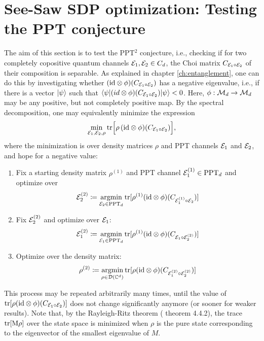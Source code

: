 \section{See-Saw SDP optimization: Testing the PPT conjecture}\label{ch:result-numerics}
The aim of this section is to test the PPT$^2$ conjecture, i.e., checking if for two completely copositive quantum channels $\mathcal E_1, \mathcal E_2 \in C_d$, the Choi matrix $C_{\mathcal E_1\circ \mathcal E_2}$ of their composition is separable. As explained in chapter \ref{ch:entanglement}, one can do this by investigating whether $(\mathrm{id} \otimes \phi)(C_{\mathcal E_1\circ \mathcal E_2})$ has a negative eigenvalue, i.e., if there is a vector $\lvert\psi\rangle$ such that $\langle\psi\rvert (id \otimes \phi)(C_{\mathcal E_1\circ \mathcal E_2}) \lvert\psi\rangle < 0$. Here, $\phi:\mathcal M_d \rightarrow \mathcal M_d$ may be any positive, but not completely positive map. By the spectral decomposition, one may equivalently minimize the expression
\begin{align}
    \min_{\mathcal{E}_1, \mathcal{E}_2, \rho} \mathrm{tr} \Big[ \rho \, (\text{id} \otimes \phi)(C_{\mathcal{E}_1 \circ \mathcal{E}_2}) \Big],
\end{align}
where the minimization is over density matrices $\rho$ and PPT channels $\mathcal E_1$ and $\mathcal E_2$, and hope for a negative value:
\begin{enumerate}
    \item Fix a starting density matrix $\rho^{(1)}$ and PPT channel $\mathcal E_1^{(1)}\in \text{PPT}_d$ and optimize over
    \begin{align*}
        \mathcal E_2^{(2)}\coloneqq \operatorname*{argmin}_{\mathcal E_2\in\text{PPT}_d}\mathrm{tr}[\rho^{(1)} (\mathrm{id} \otimes \phi)(C_{\mathcal E_1^{(1)}\circ \mathcal E_2})]
    \end{align*}
    \item Fix $\mathcal E_2^{(2)}$ and optimize over $\mathcal E_1$:
    \begin{align*}
        \mathcal E_1^{(2)}\coloneqq \operatorname*{argmin}_{\mathcal E_1\in\text{PPT}_d}\mathrm{tr}[\rho^{(1)} (\mathrm{id} \otimes \phi)(C_{\mathcal E_1\circ \mathcal E_2^{(2)}})]
    \end{align*}
    \item Optimize over the density matrix: 
    \begin{align*}
        \rho^{(2)}\coloneqq \operatorname*{argmin}_{\rho \in \mathcal D(\mathbb{C}^d)}\mathrm{tr}[\rho (\mathrm{id} \otimes \phi)(C_{\mathcal E_1^{(2)}\circ \mathcal E_2^{(2)}})]
    \end{align*}
\end{enumerate}
This process may be repeated arbitrarily many times, until the value of $\mathrm{tr}[\rho (\mathrm{id} \otimes \phi)(C_{\mathcal E_1\circ \mathcal E_2})]$ does not change significantly anymore (or sooner for weaker results). Note that, by the Rayleigh-Ritz theorem (\cite{Horn2012} theorem 4.4.2), the trace $\mathrm{tr[M \rho]}$ over the state space is minimized when $\rho$ is the pure state corresponding to the eigenvector of the smallest eigenvalue of $M$.

